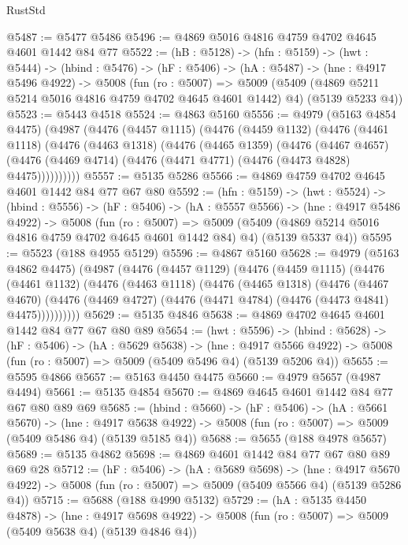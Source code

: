 \begin{lexlean}{RustStd}
\begin{coremodule}
@5487 := @5477 @5486
@5496 := @4869 @5016 @4816 @4759 @4702 @4645 @4601 @1442 @84 @77
@5522 := (hB : @5128) ->
  (hfn : @5159) ->
  (hwt : @5444) ->
  (hbind : @5476) ->
  (hF : @5406) ->
  (hA : @5487) ->
  (hne : @4917 @5496 @4922) ->
  @5008
    (fun (ro : @5007) =>
    @5009 (@5409 (@4869 @5211 @5214 @5016 @4816 @4759 @4702 @4645 @4601 @1442) @4) (@5139 @5233 @4))
@5523 := @5443 @4518
@5524 := @4863 @5160
@5556 := @4979
    (@5163 @4854 @4475)
    (@4987
      (@4476
        (@4457 @1115)
        (@4476
          (@4459 @1132)
          (@4476
            (@4461 @1118)
            (@4476
              (@4463 @1318)
              (@4476
                (@4465 @1359)
                (@4476
                  (@4467 @4657)
                  (@4476 (@4469 @4714) (@4476 (@4471 @4771) (@4476 (@4473 @4828) @4475))))))))))
@5557 := @5135 @5286
@5566 := @4869 @4759 @4702 @4645 @4601 @1442 @84 @77 @67 @80
@5592 := (hfn : @5159) ->
  (hwt : @5524) ->
  (hbind : @5556) ->
  (hF : @5406) ->
  (hA : @5557 @5566) ->
  (hne : @4917 @5486 @4922) ->
  @5008
    (fun (ro : @5007) =>
    @5009 (@5409 (@4869 @5214 @5016 @4816 @4759 @4702 @4645 @4601 @1442 @84) @4) (@5139 @5337 @4))
@5595 := @5523 (@188 @4955 @5129)
@5596 := @4867 @5160
@5628 := @4979
    (@5163 @4862 @4475)
    (@4987
      (@4476
        (@4457 @1129)
        (@4476
          (@4459 @1115)
          (@4476
            (@4461 @1132)
            (@4476
              (@4463 @1118)
              (@4476
                (@4465 @1318)
                (@4476
                  (@4467 @4670)
                  (@4476 (@4469 @4727) (@4476 (@4471 @4784) (@4476 (@4473 @4841) @4475))))))))))
@5629 := @5135 @4846
@5638 := @4869 @4702 @4645 @4601 @1442 @84 @77 @67 @80 @89
@5654 := (hwt : @5596) ->
  (hbind : @5628) ->
  (hF : @5406) ->
  (hA : @5629 @5638) ->
  (hne : @4917 @5566 @4922) -> @5008 (fun (ro : @5007) => @5009 (@5409 @5496 @4) (@5139 @5206 @4))
@5655 := @5595 @4866
@5657 := @5163 @4450 @4475
@5660 := @4979 @5657 (@4987 @4494)
@5661 := @5135 @4854
@5670 := @4869 @4645 @4601 @1442 @84 @77 @67 @80 @89 @69
@5685 := (hbind : @5660) ->
  (hF : @5406) ->
  (hA : @5661 @5670) ->
  (hne : @4917 @5638 @4922) -> @5008 (fun (ro : @5007) => @5009 (@5409 @5486 @4) (@5139 @5185 @4))
@5688 := @5655 (@188 @4978 @5657)
@5689 := @5135 @4862
@5698 := @4869 @4601 @1442 @84 @77 @67 @80 @89 @69 @28
@5712 := (hF : @5406) ->
  (hA : @5689 @5698) ->
  (hne : @4917 @5670 @4922) -> @5008 (fun (ro : @5007) => @5009 (@5409 @5566 @4) (@5139 @5286 @4))
@5715 := @5688 (@188 @4990 @5132)
@5729 := (hA : @5135 @4450 @4878) ->
  (hne : @4917 @5698 @4922) -> @5008 (fun (ro : @5007) => @5009 (@5409 @5638 @4) (@5139 @4846 @4))

\end{coremodule}
\end{lexlean}
